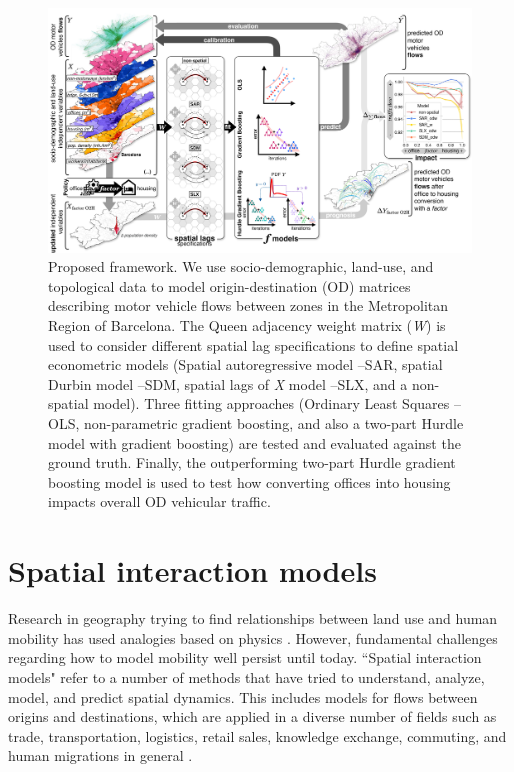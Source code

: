 \begin{figure}[h!]
    \centering
    \includegraphics[width=1\textwidth]{graph_abstr.drawio_v5.jpg}
    \caption{Proposed framework. We use socio-demographic, land-use, and topological data to model origin-destination (OD) matrices describing motor vehicle flows between zones in the Metropolitan Region of Barcelona. The Queen adjacency weight matrix (\emph{W}) is used to consider different spatial lag specifications to define spatial econometric models (Spatial autoregressive model --SAR, spatial Durbin model --SDM, spatial lags of \emph{X} model --SLX, and a non-spatial model). Three fitting approaches (Ordinary Least Squares --OLS, non-parametric gradient boosting, and also a two-part Hurdle model with gradient boosting) are tested and evaluated against the ground truth. Finally, the outperforming two-part Hurdle gradient boosting model is used to test how converting offices into housing impacts overall OD vehicular traffic.}
    \label{fig:graph_abstract}
\end{figure}

\section{Spatial interaction models}
\label{sub:ETRCO2H_1.1intro_spatial_models}

Research in geography trying to find relationships between land use and human mobility has used analogies based on physics \citep{Carey1859PrinciplesScience}.
However, fundamental challenges regarding how to model mobility well persist until today. ``Spatial interaction models" refer to a number of methods that have tried to understand, analyze, model, and predict spatial dynamics. This includes models for flows between origins and destinations, which are applied in a diverse number of fields such as trade, transportation, logistics, retail sales, knowledge exchange, commuting, and human migrations in general \citep{Sen1995GravityBehavior, Margaretic2017SpatialFlows, Thomas-Agnan2021SpatialModels}.

